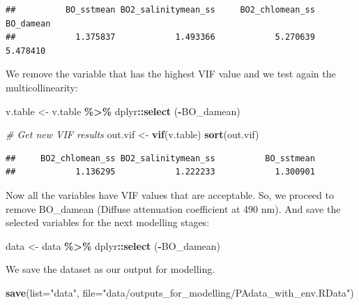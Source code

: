 \documentclass[
]{book}
\newenvironment{Shaded}{\begin{snugshade}}{\end{snugshade}}
\newcommand{\AttributeTok}[1]{\textcolor[rgb]{0.13,0.29,0.53}{#1}}
\newcommand{\CommentTok}[1]{\textcolor[rgb]{0.56,0.35,0.01}{\textit{#1}}}
\newcommand{\FunctionTok}[1]{\textcolor[rgb]{0.13,0.29,0.53}{\textbf{#1}}}
\newcommand{\NormalTok}[1]{#1}
\newcommand{\OtherTok}[1]{\textcolor[rgb]{0.56,0.35,0.01}{#1}}
\newcommand{\SpecialCharTok}[1]{\textcolor[rgb]{0.81,0.36,0.00}{\textbf{#1}}}
\newcommand{\StringTok}[1]{\textcolor[rgb]{0.31,0.60,0.02}{#1}}
\begin{document}
\begin{verbatim}
##          BO_sstmean BO2_salinitymean_ss     BO2_chlomean_ss           BO_damean 
##            1.375837            1.493366            5.270639            5.478410
\end{verbatim}

We remove the variable that has the highest VIF value and we test again the multicollinearity:

\begin{Shaded}
\begin{Highlighting}[]
\NormalTok{v.table }\OtherTok{\textless{}{-}}\NormalTok{ v.table }\SpecialCharTok{\%\textgreater{}\%} 
\NormalTok{  dplyr}\SpecialCharTok{::}\FunctionTok{select}\NormalTok{ (}\SpecialCharTok{{-}}\NormalTok{BO\_damean)}

\CommentTok{\# Get new VIF results}
\NormalTok{out.vif }\OtherTok{\textless{}{-}} \FunctionTok{vif}\NormalTok{(v.table)}
\FunctionTok{sort}\NormalTok{(out.vif)}
\end{Highlighting}
\end{Shaded}

\begin{verbatim}
##     BO2_chlomean_ss BO2_salinitymean_ss          BO_sstmean 
##            1.136295            1.222233            1.300901
\end{verbatim}

Now all the variables have VIF values that are acceptable. So, we proceed to remove BO\_damean (Diffuse attenuation coefficient at 490 nm). And save the selected variables for the next modelling stages:

\begin{Shaded}
\begin{Highlighting}[]
\NormalTok{data }\OtherTok{\textless{}{-}}\NormalTok{ data }\SpecialCharTok{\%\textgreater{}\%}\NormalTok{ dplyr}\SpecialCharTok{::}\FunctionTok{select}\NormalTok{ (}\SpecialCharTok{{-}}\NormalTok{BO\_damean)}
\end{Highlighting}
\end{Shaded}

We save the dataset as our output for modelling.

\begin{Shaded}
\begin{Highlighting}[]
\FunctionTok{save}\NormalTok{(}\AttributeTok{list=}\StringTok{"data"}\NormalTok{, }\AttributeTok{file=}\StringTok{"data/outputs\_for\_modelling/PAdata\_with\_env.RData"}\NormalTok{)}
\end{Highlighting}
\end{Shaded}
\end{document}
